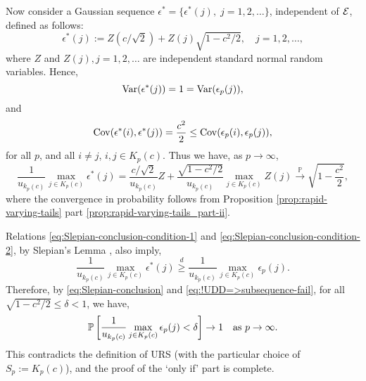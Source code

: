 Now consider a Gaussian sequence $\epsilon^* = \{\epsilon^*(j),\;j = 1,2,\ldots\}$, independent of ${\cal E}$, defined as follows:
$$
\epsilon^*(j):= Z \left(c/\sqrt{2}\right) + Z(j) \sqrt{1-{c^2}/{2}}, \quad j = 1, 2, \ldots,
$$ 
where $Z$ and $Z(j), j = 1, 2, \ldots$ are independent standard normal random variables. 
Hence,
\begin{equation} \label{eq:Slepian-conclusion-condition-1}
    {\rm Var}(\epsilon^*(j)) = 1 = {\rm Var}(\epsilon_p(j)),
\end{equation}
and
\begin{equation} \label{eq:Slepian-conclusion-condition-2}
    \cov(\epsilon^*(i),\epsilon^*(j)) = \frac{c^2}{2} \le \cov(\epsilon_p(i),\epsilon_p(j)),
\end{equation}
for all $p$, and all $i\neq j$, $i,j\in K_p(c)$.
Thus we have, as $p\to\infty$, 
\begin{equation} \label{eq:!UDD=>subsequence-fail}
    \frac{1}{u_{k_p(c)}} \max_{j\in K_p(c)} \epsilon^*(j) = \frac{c/\sqrt{2}}{u_{k_p(c)}}Z + \frac{\sqrt{1-c^2/2}}{u_{k_p(c)}} \max_{j\in K_p(c)} Z(j) \stackrel{\mathbb P}{\to} \sqrt{1-\frac{c^2}{2}},
\end{equation}
where the convergence in probability follows from Proposition \ref{prop:rapid-varying-tails} part \ref{prop:rapid-varying-tails_part-ii}.

Relations \eqref{eq:Slepian-conclusion-condition-1} and \eqref{eq:Slepian-conclusion-condition-2}, by Slepian's Lemma \cite{slepian1962one}, also imply,
\begin{equation}\label{eq:Slepian-conclusion}
  \frac{1}{u_{k_p(c)}} \max_{j\in K_p(c)} \epsilon^*(j) \stackrel{d}{\ge} \frac{1}{u_{k_p(c)}} \max_{j\in K_p(c)} \epsilon_p(j).
\end{equation}
Therefore, by \eqref{eq:Slepian-conclusion} and \eqref{eq:!UDD=>subsequence-fail}, for all $\sqrt{1-c^2/2} \le \delta < 1$, we have,
$$
\P\left[\frac{1}{u_{k_p(c)}} \max_{j\in K_p(c)} \epsilon_p(j) < \delta \right] \to 1 \quad\mbox{as  }p\to\infty.
$$
This contradicts the definition of URS (with the particular choice of $S_p:=K_p(c)$), and the proof of the `only if' part is complete.

